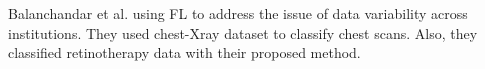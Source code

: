 Balanchandar et al. \cite{balachandar2020accounting} using FL to address the issue of data variability across institutions. They used chest-Xray dataset to classify chest scans. Also, they classified retinotherapy data with their proposed method.
















